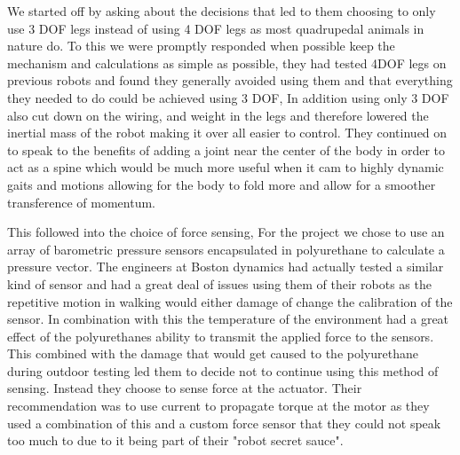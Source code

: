         We started off by asking about the decisions that led to them choosing to only use 3 DOF legs instead of using 4 DOF legs as most quadrupedal animals in nature do. To this we were promptly responded when possible keep the mechanism and calculations as simple as possible, they had tested 4DOF legs on previous robots and found they generally avoided using them and that everything they needed to do could be achieved using 3 DOF, In addition using only 3 DOF also cut down on the wiring, and weight in the legs and therefore lowered the inertial mass of the robot making it over all easier to control. They continued on to speak to the benefits of adding a joint near the center of the body in order to act as a spine which would be much more useful when it cam to highly dynamic gaits and motions allowing for the body to fold more and allow for a smoother transference of momentum.

        This followed into the choice of force sensing, For the project we chose to use an array of barometric pressure sensors encapsulated in polyurethane to calculate a pressure vector. The engineers at Boston dynamics had actually tested a similar kind of sensor and had a great deal of issues using them of their robots as the repetitive motion in walking would either damage of change the calibration of the sensor. In combination with this the temperature of the environment had a great effect of the polyurethanes ability to transmit the applied force to the sensors. This combined with the damage that would get caused to the polyurethane during outdoor testing led them to decide not to continue using this method of sensing. Instead they choose to sense force at the actuator. Their recommendation was to use current to propagate torque at the motor as they used a combination of this and a custom force sensor that they could not speak too much to due to it being part of their "robot secret sauce". 

